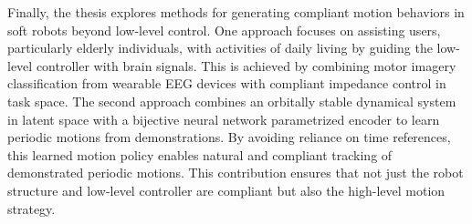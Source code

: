 Finally, the thesis explores methods for generating compliant motion behaviors in soft robots beyond low-level control. One approach focuses on assisting users, particularly elderly individuals, with activities of daily living by guiding the low-level controller with brain signals. This is achieved by combining motor imagery classification from wearable EEG devices with compliant impedance control in task space. The second approach combines an orbitally stable dynamical system in latent space with a bijective neural network parametrized encoder to learn periodic motions from demonstrations. By avoiding reliance on time references, this learned motion policy enables natural and compliant tracking of demonstrated periodic motions. This contribution ensures that not just the robot structure and low-level controller are compliant but also the high-level motion strategy.




